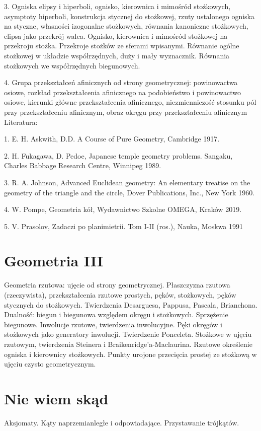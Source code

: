 \documentclass{parchment}
\begin{document}
3. Ogniska elipsy i hiperboli, ognisko, kierownica i mimośród stożkowych, asymptoty hiperboli, konstrukcja stycznej do stożkowej, rzuty ustalonego ogniska na styczne, własności izogonalne stożkowych, równania kanoniczne stożkowych, elipsa jako przekrój walca. Ognisko, kierownica i mimośród stożkowej na przekroju stożka. Przekroje stożków ze sferami wpisanymi. Równanie ogólne stożkowej w układzie współrzędnych, duży i mały wyznacznik. Równania stożkowych we współrzędnych biegunowych.

4. Grupa przekształceń afinicznych od strony geometrycznej: powinowactwa osiowe, rozkład przekształcenia afinicznego na podobieństwo i powinowactwo osiowe, kierunki główne przekształcenia afinicznego, niezmienniczość stosunku pól przy przekształceniu afinicznym, obraz okręgu przy przekształceniu afinicznym
Literatura: 	

1. E. H. Askwith, D.D. A Course of Pure Geometry, Cambridge 1917.

2. H. Fukagawa, D. Pedoe, Japanese temple geometry problems. Sangaku, Charles Babbage Research Centre, Winnipeg 1989.

3. R. A. Johnson, Advanced Euclidean geometry: An elementary treatise on the geometry of the triangle and the circle, Dover Publications, Inc., New York 1960.

4. W. Pompe, Geometria kół, Wydawnictwo Szkolne OMEGA, Kraków 2019.

5. V. Prasolov, Zadaczi po planimietrii. Tom I-II (ros.), Nauka, Moskwa 1991

\section{Geometria III}
Geometria rzutowa: ujęcie od strony geometrycznej. Płaszczyzna rzutowa (rzeczywista), przekształcenia rzutowe prostych, pęków, stożkowych, pęków stycznych do stożkowych.
{\color{gray}
Twierdzenia Desarguesa, Pappusa, Pascala, Brianchona.
}
Dualność: biegun i biegunowa względem okręgu i stożkowych. Sprzężenie biegunowe. Inwolucje rzutowe, twierdzenia inwolucyjne. Pęki okręgów i stożkowych jako generatory inwolucji. Twierdzenie Ponceleta. Stożkowe w ujęciu rzutowym, twierdzenia Steinera i Braikenridge'a-Maclaurina. Rzutowe określenie ogniska i kierownicy stożkowych. Punkty urojone przecięcia prostej ze stożkową w ujęciu czysto geometrycznym.

\section{Nie wiem skąd}
Aksjomaty. Kąty naprzemianległe i odpowiadające.
Przystawanie trójkątów.
\end{document}
